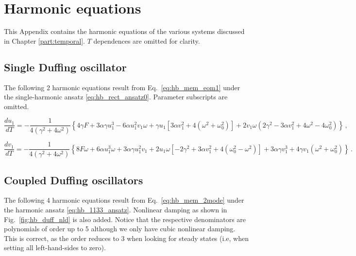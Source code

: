 
\chapter{Harmonic equations} \label{app:harmeqs}

This Appendix contains the harmonic equations of the various systems discussed in Chapter \ref{part:temporal}. $T$ dependences are omitted for clarity. 	

\section{Single Duffing oscillator} \label{app:harmeqs_11}

The following 2 harmonic equations result from Eq.~\eqref{eq:hb_mem_eom1} under the single-harmonic ansatz \eqref{eq:hb_rect_ansatz0}. Parameter subscripts are omitted. 

\begin{dmath}
\frac{d u_1}{dT} = -\frac{1}{4 \left(\gamma ^2+4 \omega ^2\right)} \left\{4 \gamma  F+3 \alpha  \gamma  u_1^3-6 \alpha  u_1^2 v_1 \omega +\gamma  u_1 \left[3 \alpha  v_1^2+4 \left(\omega ^2+\omega_0^2\right)\right]+2 v_1 \omega  \left(2 \gamma ^2-3 \alpha  v_1^2+4 \omega ^2-4 \omega_0^2\right) \right\} \,,
\end{dmath}

\begin{dmath}	
\frac{d v_1}{dT} = -\frac{1}{4 \left(\gamma ^2+4 \omega ^2\right)} \left\{8 F \omega +6 \alpha  u_1^3 \omega +3 \alpha  \gamma  u_1^2 v_1+2 u_1 \omega  \left[-2 \gamma ^2+3 \alpha  v_1^2  + 4 \left(\omega_0^2 - \omega^2 \right) \right]+3 \alpha  \gamma  v_1^3+4 \gamma  v_1 \left(\omega ^2+\omega_0^2\right) \right\} \,.
\end{dmath}

\section{Coupled Duffing oscillators} \label{app:harmeqs_1133}

The following 4 harmonic equations result from Eq.~\eqref{eq:hb_mem_2mode} under the harmonic ansatz \eqref{eq:hb_1133_ansatz}. Nonlinear damping as shown in Fig.~\ref{fig:hb_duff_nld} is also added. Notice that the respective denominators are polynomials of order up to 5 although we only have cubic nonlinear damping. This is correct, as the order reduces to 3 when looking for steady states (i.e, when setting all left-hand-sides to zero). 

